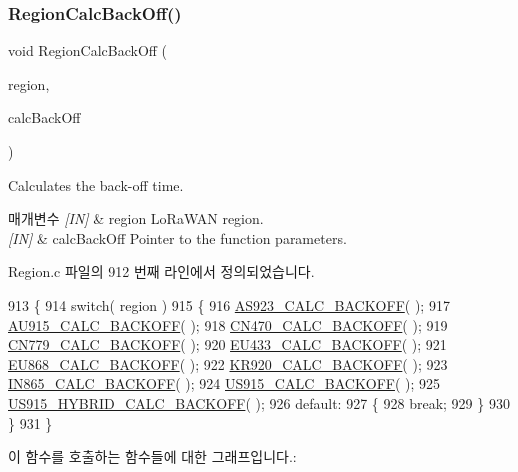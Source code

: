 \subsubsection{\texorpdfstring{Region\+Calc\+Back\+Off()}{RegionCalcBackOff()}}
{\footnotesize\ttfamily void Region\+Calc\+Back\+Off (\begin{DoxyParamCaption}\item[{\mbox{\hyperlink{group___l_o_r_a_m_a_c_ga80c48efda9ae02e14b58160d34a798dd}{Lo\+Ra\+Mac\+Region\+\_\+t}}}]{region,  }\item[{\mbox{\hyperlink{group___r_e_g_i_o_n_ga7c5c9a8da174e6679eded8257dc92fd9}{Calc\+Back\+Off\+Params\+\_\+t}} $\ast$}]{calc\+Back\+Off }\end{DoxyParamCaption})}



Calculates the back-\/off time. 


\begin{DoxyParams}{매개변수}
{\em \mbox{[}\+I\+N\mbox{]}} & region Lo\+Ra\+W\+AN region.\\
\hline
{\em \mbox{[}\+I\+N\mbox{]}} & calc\+Back\+Off Pointer to the function parameters. \\
\hline
\end{DoxyParams}


Region.\+c 파일의 912 번째 라인에서 정의되었습니다.


\begin{DoxyCode}
913 \{
914     \textcolor{keywordflow}{switch}( region )
915     \{
916         \mbox{\hyperlink{_region_8c_ab1d11f983e2c4dc9ba4f482943f15b06}{AS923\_CALC\_BACKOFF}}( );
917         \mbox{\hyperlink{_region_8c_a27ecec930edfd7be6a001bbdf915a28f}{AU915\_CALC\_BACKOFF}}( );
918         \mbox{\hyperlink{_region_8c_a99b1e842dd32f8a305783fb1df555c5f}{CN470\_CALC\_BACKOFF}}( );
919         \mbox{\hyperlink{_region_8c_a5bba41f07d1cc6ae63f2d4fd014f4a33}{CN779\_CALC\_BACKOFF}}( );
920         \mbox{\hyperlink{_region_8c_a1c27ca0eaaa6fd93f6604733330f2181}{EU433\_CALC\_BACKOFF}}( );
921         \mbox{\hyperlink{_region_8c_a7b32867ef9cb973f1c09b9ca39b3bdd5}{EU868\_CALC\_BACKOFF}}( );
922         \mbox{\hyperlink{_region_8c_aa662ee1835dfde496d4be30e6c8ff5ae}{KR920\_CALC\_BACKOFF}}( );
923         \mbox{\hyperlink{_region_8c_a7fe6b9ff5a40fda204d473fc6fe800d0}{IN865\_CALC\_BACKOFF}}( );
924         \mbox{\hyperlink{_region_8c_a9a182860a57dfd53a8d8466eee22c443}{US915\_CALC\_BACKOFF}}( );
925         \mbox{\hyperlink{_region_8c_af4ff50a968e17a6cb98438f8d2648e60}{US915\_HYBRID\_CALC\_BACKOFF}}( );
926         \textcolor{keywordflow}{default}:
927         \{
928             \textcolor{keywordflow}{break};
929         \}
930     \}
931 \}
\end{DoxyCode}
이 함수를 호출하는 함수들에 대한 그래프입니다.\+:
\mbox{\label{group___r_e_g_i_o_n_ga795ed3c13f4c8d03e39298fd64e5b2df}} 
